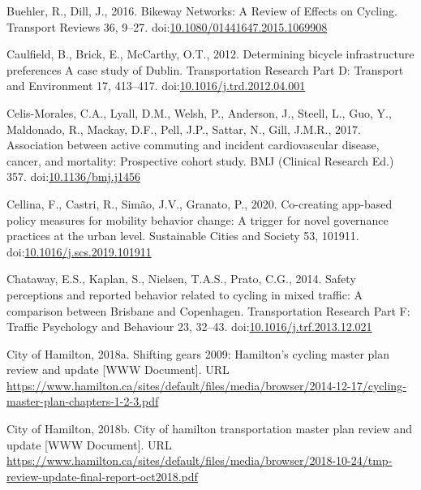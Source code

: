 \documentclass[]{elsarticle} %
\begin{document}
\leavevmode\hypertarget{ref-buehlerBikewayNetworksReview2016b}{}%
Buehler, R., Dill, J., 2016. Bikeway Networks: A Review of Effects on
Cycling. Transport Reviews 36, 9--27.
doi:\href{https://doi.org/10.1080/01441647.2015.1069908}{10.1080/01441647.2015.1069908}

\leavevmode\hypertarget{ref-caulfieldDeterminingBicycleInfrastructure2012}{}%
Caulfield, B., Brick, E., McCarthy, O.T., 2012. Determining bicycle
infrastructure preferences A case study of Dublin. Transportation
Research Part D: Transport and Environment 17, 413--417.
doi:\href{https://doi.org/10.1016/j.trd.2012.04.001}{10.1016/j.trd.2012.04.001}

\leavevmode\hypertarget{ref-celis-moralesAssociationActiveCommuting2017b}{}%
Celis-Morales, C.A., Lyall, D.M., Welsh, P., Anderson, J., Steell, L.,
Guo, Y., Maldonado, R., Mackay, D.F., Pell, J.P., Sattar, N., Gill,
J.M.R., 2017. Association between active commuting and incident
cardiovascular disease, cancer, and mortality: Prospective cohort study.
BMJ (Clinical Research Ed.) 357.
doi:\href{https://doi.org/10.1136/bmj.j1456}{10.1136/bmj.j1456}

\leavevmode\hypertarget{ref-cellinaCocreatingAppbasedPolicy2020}{}%
Cellina, F., Castri, R., Simão, J.V., Granato, P., 2020. Co-creating
app-based policy measures for mobility behavior change: A trigger for
novel governance practices at the urban level. Sustainable Cities and
Society 53, 101911.
doi:\href{https://doi.org/10.1016/j.scs.2019.101911}{10.1016/j.scs.2019.101911}

\leavevmode\hypertarget{ref-chatawaySafetyPerceptionsReported2014}{}%
Chataway, E.S., Kaplan, S., Nielsen, T.A.S., Prato, C.G., 2014. Safety
perceptions and reported behavior related to cycling in mixed traffic: A
comparison between Brisbane and Copenhagen. Transportation Research Part
F: Traffic Psychology and Behaviour 23, 32--43.
doi:\href{https://doi.org/10.1016/j.trf.2013.12.021}{10.1016/j.trf.2013.12.021}

\leavevmode\hypertarget{ref-Cmp2009}{}%
City of Hamilton, 2018a. Shifting gears 2009: Hamilton's cycling master
plan review and update {[}WWW Document{]}. URL
\url{https://www.hamilton.ca/sites/default/files/media/browser/2014-12-17/cycling-master-plan-chapters-1-2-3.pdf}

\leavevmode\hypertarget{ref-Tmp2018}{}%
City of Hamilton, 2018b. City of hamilton transportation master plan
review and update {[}WWW Document{]}. URL
\url{https://www.hamilton.ca/sites/default/files/media/browser/2018-10-24/tmp-review-update-final-report-oct2018.pdf}
\end{document}
